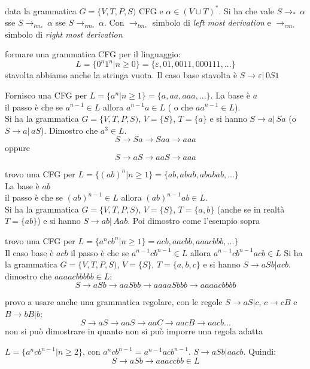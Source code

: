 \begin{theorem}
	data la grammatica $G=\{V,T,P,S)$ CFG e $\alpha\in (V\cup T)^*$. Si ha che vale $S\to_*\, \alpha$ sse $S\to_{lm_*}\, \alpha$ sse $S\to_{rm_*}\, \alpha$. Con $\to_{lm_*}$ simbolo di \textit{left most derivation }e $\to_{rm_*}$ simbolo di \textit{right most derivation}
\end{theorem}
\begin{example}
	formare una grammatica CFG per il linguaggio:
	$$L=\{0^n 1^n| n\geq 0\}=\{\varepsilon, 01, 0011, 000111,...\}$$
	stavolta abbiamo anche la stringa vuota. Il caso base stavolta è $S\to\varepsilon| \, 0S1$
\end{example}
\begin{example}
	Fornisco una CFG per $L=\{a^n|n\geq 1\}=\{a, aa, aaa,...\}$.
	La base è $a$ \\il passo è che se $a^{n-1}\in L$ allora $a^{n-1}a\in L$ ( o che $aa^{n-1}\in L$).\\
	Si ha la grammatica $G=\{V,T,P,S)$, $V=\{S\}$, $T=\{a\}$ e si hanno $S\to a|\,Sa$ (o  $S\to a|\,aS$). Dimostro che $a^3\in L$.
	$$S\to Sa \to Saa\to aaa$$
	oppure
	$$S\to aS\to aaS\to aaa$$
\end{example}
\begin{example}
	trovo una CFG per $L=\{(ab)^n|n\geq 1\}=\{ab, abab, ababab,...\}$\\
	La base è $ab$ \\il passo è che se $(ab)^{n-1}\in L$ allora $(ab)^{n-1}ab\in L$.\\
	Si ha la grammatica $G=\{V,T,P,S)$, $V=\{S\}$, $T=\{a,b\}$ (anche se in realtà $T=\{ab\}$) e si hanno $S\to ab|\,Aab$. Poi dimostro come l'esempio sopra
\end{example}
\begin{example}
	trovo una CFG per $L=\{a^n c b^n|n\geq 1\}=acb,aacbb,aaacbbb,...\}$\\
	Il caso base è $acb$ il passo è che se $a^{n-1}cb^{n-1}\in L$ allora $a^{n-1}cb^{n-1}acb\in L$
	Si ha la grammatica $G=\{V,T,P,S)$, $V=\{S\}$, $T=\{a,b,c\}$ e si hanno $S\to aSb|acb$.\\
	dimostro che $aaaacbbbbb\in L$:
	$$S\to aSb\to aaSbb\to aaaaSbbb\to aaaacbbbb$$

	provo a usare anche una grammatica regolare, con le regole $S\to aS|c$, $c\to cB$ e $B\to bB|b$;
	$$S\to aS\to aaS\to aaC\to aacB\to aacb...$$
	non si può dimostrare in quanto non si può imporre una regola adatta
\end{example}
\begin{example}
	$L=\{a^n c b^{n-1}|n\geq 2\}$, con $a^n c b^{n-1}=a^{n-1}acb^{n-1}$. $S\to aSb|aacb$. Quindi:
	$$S\to aSb\to aaaccbb\in L$$
\end{example}
